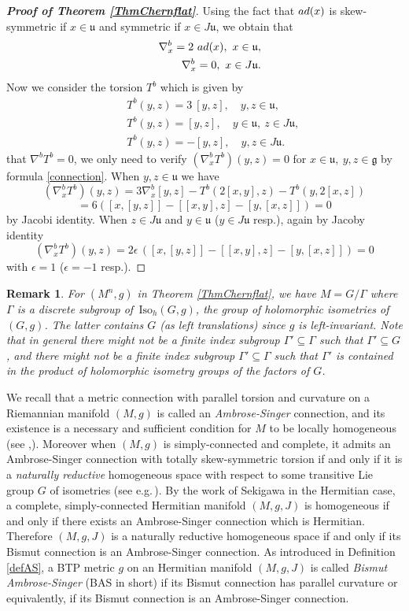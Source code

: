\documentclass{amsart}
\numberwithin{equation}{section}
\newtheorem{remark}  [theorem]     {Remark}
\theoremstyle{definition}
\renewcommand{\1}{\mathds{1}}
\renewcommand{\gg}{\mathfrak g}
\newcommand{\gu}{\mathfrak u}
\newcommand{\ad}{\rm {ad}}
\renewcommand{\>}{\rightarrow}
\begin{document}
\begin{proof}[{\bf Proof of Theorem \ref{ThmChernflat}}]
Using the fact that ${\rm ad}(x)$ is skew-symmetric if $x\in\gu$ and symmetric if $x\in J\gu$, we obtain that
\begin{eqnarray}
&& \nabla^b_x = 2\ \ad(x),\ x\in\gu,\\
&&\label{connection}\nabla^b_x = 0,\ x\in J\gu.
\end{eqnarray}
Now we consider the torsion $T^b$ which is given by
\begin{eqnarray}
&& T^b(y,z) = 3\ [y,z],\quad y,z\in\gu,\\
&& T^b(y,z)= [y,z],\quad y\in \gu,\ z\in J\gu,\\
&&T^b(y,z) = -[y,z],\quad y,z\in J\gu.
\end{eqnarray}
that $\nabla^bT^b=0$, we only need to verify $(\nabla^b_xT^b)(y,z) = 0$ for $x\in \gu,\ y,z\in \gg$ by formula \eqref{connection}.
When $y,z\in \gu$ we have
$$(\nabla^b_xT^b)(y,z)= 3\nabla^b_x[y,z] - T^b(2[x,y],z )- T^b(y, 2[x,z])$$
$$ = 6 \left([x,[y,z]] - [[x,y],z] - [y,[x,z]]\right) = 0$$
by Jacobi identity. When $z\in J\gu$ and $y\in \gu$ ($y\in J\gu$ resp.), again by Jacoby identity
$$(\nabla^b_xT^b)(y,z) = 2\epsilon\, ([x,[y,z]] - [[x,y],z] - [y,[x,z]]) = 0$$
with $\epsilon =1$ ($\epsilon=-1$ resp.).

\end{proof}


\begin{remark}
For $(M^n,g)$ in Theorem \ref{ThmChernflat}, we have $M=G/\Gamma$ where $\Gamma$ is a discrete subgroup of $\,\mbox{Iso}_{h}(G,g)$, the group of holomorphic isometries of $(G,g)$. The latter contains $G$ (as left translations) since $g$ is left-invariant. Note that in general there might not be a finite index subgroup $\Gamma'\subseteq \Gamma$ such that $\Gamma'\subseteq G$, and there might not be a finite index subgroup $\Gamma'\subseteq \Gamma$ such that $\Gamma'$ is contained in the product of holomorphic isometry groups of the factors of $G$.
\end{remark}



We recall that a metric connection with parallel torsion and curvature on a Riemannian manifold $(M,g)$ is called an {\em Ambrose-Singer} connection, and its existence is a
necessary and sufficient condition for $M$ to be locally homogeneous (see \cite{AS},\cite{TV}). Moreover when $(M,g)$ is simply-connected and complete, it admits an Ambrose-Singer connection with totally skew-symmetric torsion if and only if it is a {\em naturally reductive} homogeneous space with respect to some transitive Lie group $G$ of isometries (see e.g.\,\cite{TV}). By the work of Sekigawa \cite{Sekigawa} in the Hermitian case, a complete, simply-connected Hermitian manifold $(M,g,J)$ is homogeneous if and only if there exists an Ambrose-Singer connection which is Hermitian. Therefore $(M,g,J)$ is a  naturally reductive homogeneous space if and only if its Bismut connection is an Ambrose-Singer connection. As introduced in Definition \ref{defAS}, a {\rm BTP} metric $g$ on an Hermitian manifold $(M,g,J)$ is called {\em Bismut Ambrose-Singer} ({\rm BAS} in short) if its Bismut connection has parallel curvature or equivalently, if its Bismut connection is an Ambrose-Singer connection.
\end{document}
